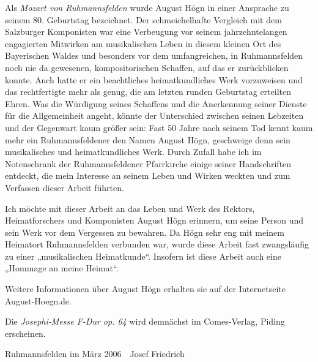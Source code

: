 \documentclass[a4paper]{article}
\begin{document}
Als \textit{Mozart von Ruhmannsfelden} wurde August Högn in einer
Ansprache zu seinem 80. Geburtstag bezeichnet. Der schmeichelhafte
Vergleich mit dem Salzburger Komponisten war eine Verbeugung vor seinem
jahrzehntelangen engagierten Mitwirken am musikalischen Leben in diesem
kleinen Ort des Bayerischen Waldes und besonders vor dem umfangreichen,
in Ruhmannsfelden noch nie da gewesenen, kompositorischen Schaffen, auf
das er zurückblicken konnte. Auch hatte er ein beachtliches
heimatkundliches Werk vorzuweisen und das rechtfertigte mehr als genug,
die am letzten runden Geburtstag erteilten Ehren. Was die Würdigung
seines Schaffens und die Anerkennung seiner Dienste für die
Allgemeinheit angeht, könnte der Unterschied zwischen seinen Lebzeiten
und der Gegenwart  kaum größer sein: Fast 50 Jahre nach seinem Tod
kennt kaum mehr ein Ruhmannsfeldener den Namen August Högn, geschweige
denn sein musikalisches und heimatkundliches Werk. Durch Zufall habe
ich im Notenschrank der Ruhmannsfeldener Pfarrkirche einige seiner
Handschriften entdeckt, die mein Interesse an seinem Leben und Wirken
weckten und zum Verfassen dieser Arbeit führten.

Ich möchte mit dieser Arbeit an das Leben und Werk des Rektors,
Hei\-matforschers und Komponisten August Högn erinnern, um seine Person
und sein Werk vor dem Vergessen zu bewahren. Da Högn sehr eng mit
meinem Heimatort Ruhmannsfelden verbunden war, wurde diese Arbeit fast
zwangs\-läufig zu einer „musikalischen Heimatkunde“. Insofern ist diese
Arbeit auch eine „Hommage an meine Heimat“.

Weitere Informationen über August Högn erhalten sie auf der
Internetseite August-Hoegn.de.

Die \textit{Josephi-Messe F-Dur op. 64} wird demnächst im Comes-Verlag,
Piding erscheinen. 

Ruhmannsfelden im März 2006\ \ Josef Friedrich

\end{document}

